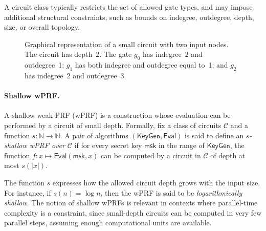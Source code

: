 \documentclass[journal=tosc,submission]{iacrtrans}
\theoremstyle{theorem}
\newcommand\msk{\ensuremath{\mathsf{msk}}\xspace}
\newcommand\KeyGen{\ensuremath{\mathsf{KeyGen}}\xspace}
\newcommand\Eval{\ensuremath{\mathsf{Eval}}\xspace}
\begin{document}
A circuit class typically restricts the set of allowed gate types, and may impose additional structural constraints, such as bounds on indegree, outdegree, depth, size, or overall topology.


\begin{figure}
\centering

\caption{\label{fig:circuit}Graphical representation of a small circuit with two input nodes. The circuit has depth~2. The gate $g_0$ has indegree~2 and outdegree~1; $g_1$ has both indegree and outdegree equal to~1; and $g_2$ has indegree~2 and outdegree~3.}
\end{figure}

\paragraph{Shallow wPRF.}
A shallow weak PRF (wPRF) is a construction whose evaluation can be performed by a circuit of small depth. Formally, fix a class of circuits $\mathcal{C}$ and a function $s: \mathbb{N} \to \mathbb{N}$. A pair of algorithms $(\KeyGen, \Eval)$ is said to define an \emph{$s$-shallow wPRF over $\mathcal{C}$} if for every secret key $\msk$ in the range of $\KeyGen$, the function $f : x \mapsto \Eval(\msk, x)$ can be computed by a circuit in $\mathcal{C}$ of depth at most $s(|x|)$.

The function $s$ expresses how the allowed circuit depth grows with the input size. For instance, if $s(n) = \log n$, then the wPRF is said to be \emph{logarithmically shallow}. The notion of shallow wPRFs is relevant in contexts where parallel-time complexity is a constraint, since small-depth circuits can be computed in very few parallel steps, assuming enough computational units are available.
\end{document}
